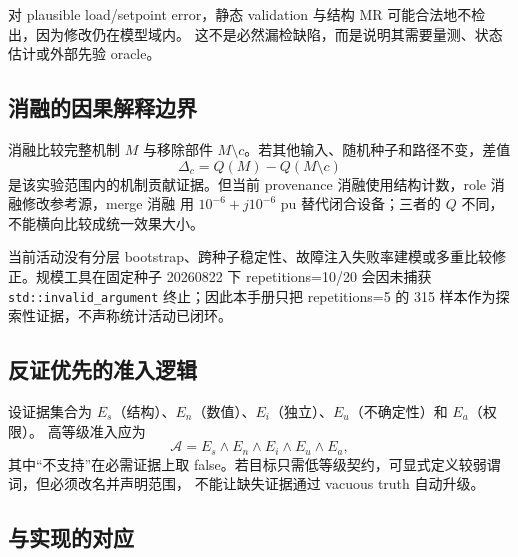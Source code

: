对 plausible load/setpoint error，静态 validation 与结构 MR 可能合法地不检出，因为修改仍在模型域内。
这不是必然漏检缺陷，而是说明其需要量测、状态估计或外部先验 oracle。

\subsection{消融的因果解释边界}

消融比较完整机制 $M$ 与移除部件 $M\setminus c$。若其他输入、随机种子和路径不变，差值
\begin{equation}
 \Delta_c=Q(M)-Q(M\setminus c)
\end{equation}
是该实验范围内的机制贡献证据。但当前 provenance 消融使用结构计数，role 消融修改参考源，merge 消融
用 $10^{-6}+j10^{-6}$ pu 替代闭合设备；三者的 $Q$ 不同，不能横向比较成统一效果大小。

\begin{gapnote}
当前活动没有分层 bootstrap、跨种子稳定性、故障注入失败率建模或多重比较修正。规模工具在固定种子
20260822 下 repetitions=10/20 会因未捕获 \texttt{std::invalid\_argument} 终止；因此本手册只把
repetitions=5 的 315 样本作为探索性证据，不声称统计活动已闭环。
\end{gapnote}

\subsection{反证优先的准入逻辑}

设证据集合为 $E_s$（结构）、$E_n$（数值）、$E_i$（独立）、$E_u$（不确定性）和 $E_a$（权限）。
高等级准入应为
\begin{equation}
 \mathcal A=E_s\land E_n\land E_i\land E_u\land E_a,
 \label{eq:sppt-joint-admission}
\end{equation}
其中“不支持”在必需证据上取 false。若目标只需低等级契约，可显式定义较弱谓词，但必须改名并声明范围，
不能让缺失证据通过 vacuous truth 自动升级。

\subsection{与实现的对应}

